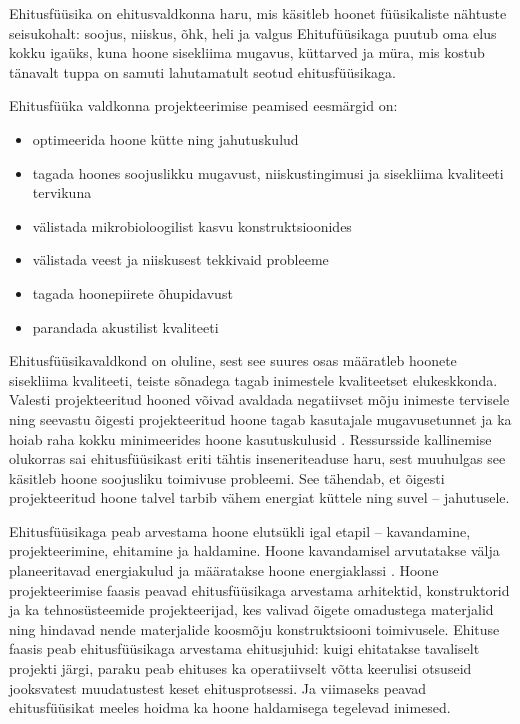 \label{chapters:introduction}
Ehitusfüüsika on ehitusvaldkonna haru, mis käsitleb hoonet füüsikaliste nähtuste seisukohalt: soojus, niiskus, õhk, heli ja valgus
Ehitufüüsikaga puutub oma elus kokku igaüks, kuna hoone sisekliima mugavus, küttarved ja müra, mis kostub tänavalt tuppa
on samuti lahutamatult seotud ehitusfüüsikaga.

Ehitusfüüka valdkonna projekteerimise peamised eesmärgid on:
\begin{itemize}
    \item optimeerida hoone kütte ning jahutuskulud
    \item tagada hoones soojuslikku mugavust, niiskustingimusi ja sisekliima kvaliteeti tervikuna
    \item välistada mikrobioloogilist kasvu konstruktsioonides
    \item välistada veest ja niiskusest tekkivaid probleeme
    \item tagada hoonepiirete õhupidavust
    \item parandada akustilist kvaliteeti
\end{itemize}

Ehitusfüüsikavaldkond on oluline, sest see suures osas määratleb hoonete sisekliima kvaliteeti, teiste sõnadega tagab inimestele kvaliteetset 
elukeskkonda. Valesti projekteeritud hooned võivad avaldada negatiivset mõju inimeste tervisele \cite{rokka_hygrothermal} ning seevastu õigesti projekteeritud 
hoone tagab kasutajale mugavusetunnet ja ka hoiab raha kokku minimeerides hoone kasutuskulusid \cite{rokka_hygrothermal}. Ressursside kallinemise olukorras sai 
ehitusfüüsikast eriti tähtis inseneriteaduse haru, sest muuhulgas see käsitleb hoone soojusliku toimivuse probleemi. See tähendab, et 
õigesti projekteeritud hoone talvel tarbib vähem energiat küttele ning suvel -- jahutusele.

Ehitusfüüsikaga peab arvestama hoone elutsükli igal etapil -- kavandamine, projekteerimine, ehitamine ja haldamine. Hoone kavandamisel 
arvutatakse välja planeeritavad energiakulud ja määratakse hoone energiaklassi \cite{energia_miinimum}. Hoone projekteerimise faasis peavad ehitusfüüsikaga arvestama arhitektid, 
konstruktorid ja ka tehnosüsteemide projekteerijad, kes valivad õigete omadustega materjalid ning hindavad nende materjalide koosmõju 
konstruktsiooni toimivusele. Ehituse faasis peab ehitusfüüsikaga arvestama ehitusjuhid: kuigi ehitatakse tavaliselt projekti järgi, 
paraku peab ehituses ka operatiivselt võtta keerulisi otsuseid jooksvatest muudatustest keset ehitusprotsessi. Ja viimaseks peavad 
ehitusfüüsikat meeles hoidma ka hoone haldamisega tegelevad inimesed.

